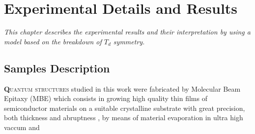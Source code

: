 \chapter{Experimental Details and Results}
\label{chap:experimentals-details-and-results}
\textit{This chapter describes the experimental results and their interpretation by using a model based on the breakdown of $T_d$ symmetry.}
\vfill
\minitoc
\newpage

\section{Samples Description}
\label{sec:chapter-3-section-samples-description}
\vspace{-10mm}
\lettrine[lines=3, lraise=.1, nindent=0mm, slope=0mm]{\textbf{Q}}{uantum structures} 
studied in this work were fabricated by Molecular Beam Epitaxy (MBE) which consists in growing high quality thin films of semiconductor materials on a suitable crystalline substrate  with great precision, both thickness and abruptness \cite{orton2015molecular}, by means of material evaporation in ultra high vaccum and 
